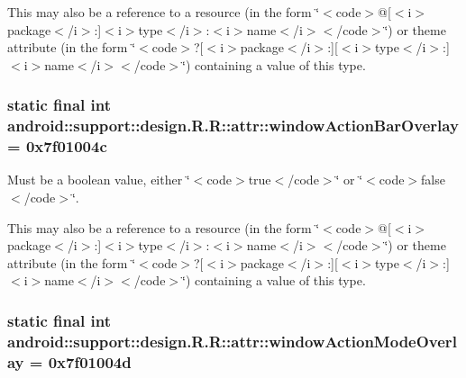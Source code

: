 This may also be a reference to a resource (in the form \char`\"{}$<$code$>$@\mbox{[}$<$i$>$package$<$/i$>$:\mbox{]}$<$i$>$type$<$/i$>$:$<$i$>$name$<$/i$>$$<$/code$>$\char`\"{}) or theme attribute (in the form \char`\"{}$<$code$>$?\mbox{[}$<$i$>$package$<$/i$>$:\mbox{]}\mbox{[}$<$i$>$type$<$/i$>$:\mbox{]}$<$i$>$name$<$/i$>$$<$/code$>$\char`\"{}) containing a value of this type. \hypertarget{classandroid_1_1support_1_1design_1_1_r_1_1attr_add17c6b2b4351967e0a97e924d870d3}{
\subsubsection[{windowActionBarOverlay}]{\setlength{\rightskip}{0pt plus 5cm}static final int android::support::design.R.R::attr::windowActionBarOverlay = 0x7f01004c}}
\label{classandroid_1_1support_1_1design_1_1_r_1_1attr_add17c6b2b4351967e0a97e924d870d3}


Must be a boolean value, either \char`\"{}$<$code$>$true$<$/code$>$\char`\"{} or \char`\"{}$<$code$>$false$<$/code$>$\char`\"{}. 

This may also be a reference to a resource (in the form \char`\"{}$<$code$>$@\mbox{[}$<$i$>$package$<$/i$>$:\mbox{]}$<$i$>$type$<$/i$>$:$<$i$>$name$<$/i$>$$<$/code$>$\char`\"{}) or theme attribute (in the form \char`\"{}$<$code$>$?\mbox{[}$<$i$>$package$<$/i$>$:\mbox{]}\mbox{[}$<$i$>$type$<$/i$>$:\mbox{]}$<$i$>$name$<$/i$>$$<$/code$>$\char`\"{}) containing a value of this type. \hypertarget{classandroid_1_1support_1_1design_1_1_r_1_1attr_9b33a9d31a46283c061f1bb1559fb361}{
\subsubsection[{windowActionModeOverlay}]{\setlength{\rightskip}{0pt plus 5cm}static final int android::support::design.R.R::attr::windowActionModeOverlay = 0x7f01004d}}
\label{classandroid_1_1support_1_1design_1_1_r_1_1attr_9b33a9d31a46283c061f1bb1559fb361}


